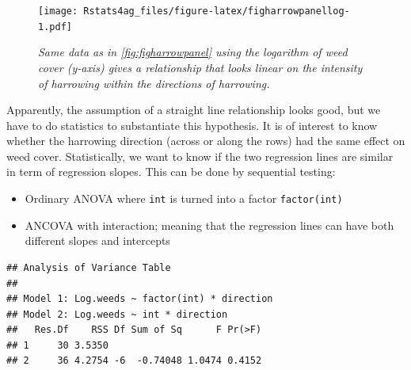 \documentclass[letterpaper,]{book}
\newenvironment{Shaded}{\begin{snugshade}}{\end{snugshade}}
\newcommand{\DataTypeTok}[1]{\textcolor[rgb]{0.13,0.29,0.53}{#1}}
\newcommand{\KeywordTok}[1]{\textcolor[rgb]{0.13,0.29,0.53}{\textbf{#1}}}
\newcommand{\NormalTok}[1]{#1}
\newcommand{\OperatorTok}[1]{\textcolor[rgb]{0.81,0.36,0.00}{\textbf{#1}}}
\newcommand{\StringTok}[1]{\textcolor[rgb]{0.31,0.60,0.02}{#1}}
\providecommand{\tightlist}{%
  \setlength{\itemsep}{0pt}\setlength{\parskip}{0pt}}
\begin{document}
\begin{figure}
\centering
\texttt{[image: Rstats4ag\_files/figure-latex/figharrowpanellog-1.pdf]}
\caption{\label{fig:figharrowpanellog}\emph{Same data as in \ref{fig:figharrowpanel} using the logarithm of weed cover (y-axis) gives a relationship that looks linear on the intensity of harrowing within the directions of harrowing.}}
\end{figure}

Apparently, the assumption of a straight line relationship looks good, but we have to do statistics to substantiate this hypothesis. It is of interest to know whether the harrowing direction (across or along the rows) had the same effect on weed cover. Statistically, we want to know if the two regression lines are similar in term of regression slopes. This can be done by sequential testing:

\begin{itemize}
\tightlist
\item
  Ordinary ANOVA where \texttt{int} is turned into a factor \texttt{factor(int)}
\item
  ANCOVA with interaction; meaning that the regression lines can have both different slopes and intercepts
\end{itemize}

\begin{Shaded}
\end{Shaded}

\begin{verbatim}
## Analysis of Variance Table
## 
## Model 1: Log.weeds ~ factor(int) * direction
## Model 2: Log.weeds ~ int * direction
##   Res.Df    RSS Df Sum of Sq      F Pr(>F)
## 1     30 3.5350                           
## 2     36 4.2754 -6  -0.74048 1.0474 0.4152
\end{verbatim}
\end{document}
